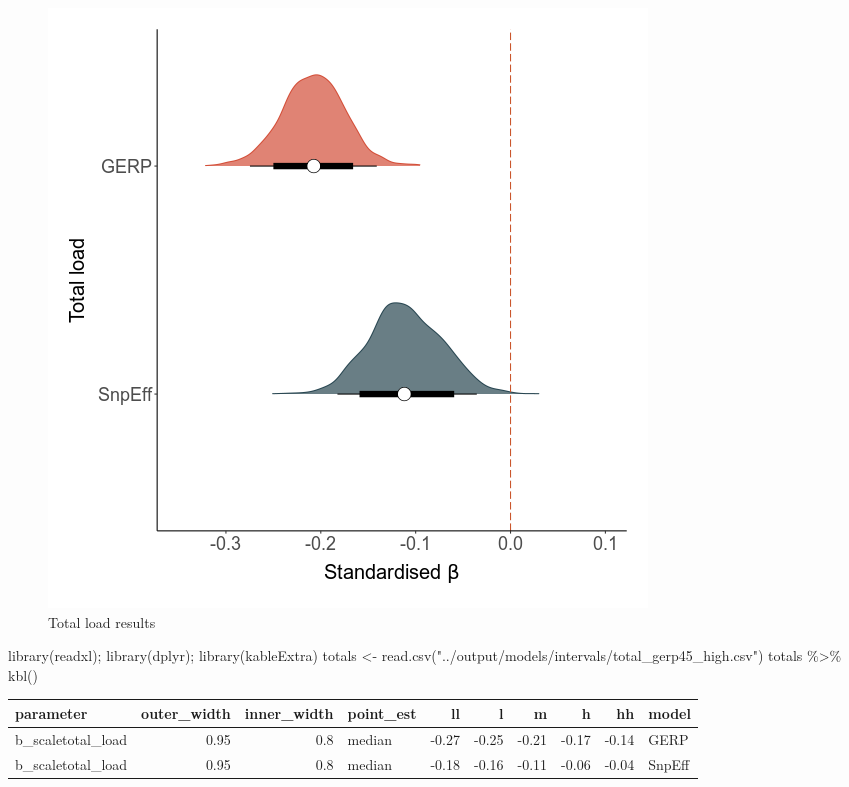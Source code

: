 \documentclass[
  letterpaper,
  DIV=11,
  numbers=noendperiod]{scrreprt}
\newenvironment{Shaded}{}{}
\newcommand{\FunctionTok}[1]{\textcolor[rgb]{0.44,0.26,0.76}{#1}}
\newcommand{\NormalTok}[1]{\textcolor[rgb]{0.14,0.16,0.18}{#1}}
\newcommand{\OtherTok}[1]{\textcolor[rgb]{0.44,0.26,0.76}{#1}}
\newcommand{\SpecialCharTok}[1]{\textcolor[rgb]{0.00,0.36,0.77}{#1}}
\newcommand{\StringTok}[1]{\textcolor[rgb]{0.01,0.18,0.38}{#1}}
\begin{document}
\begin{figure}

{\centering \includegraphics{qmd/../plots/main/fig_2a.png}

}

\caption{Total load results}

\end{figure}

\begin{Shaded}
\begin{Highlighting}[]
\FunctionTok{library}\NormalTok{(readxl); }\FunctionTok{library}\NormalTok{(dplyr); }\FunctionTok{library}\NormalTok{(kableExtra)}
\NormalTok{totals }\OtherTok{\textless{}{-}} \FunctionTok{read.csv}\NormalTok{(}\StringTok{"../output/models/intervals/total\_gerp45\_high.csv"}\NormalTok{)}
\NormalTok{totals }\SpecialCharTok{\%\textgreater{}\%} \FunctionTok{kbl}\NormalTok{() }
\end{Highlighting}
\end{Shaded}

\begin{tabular}[t]{l|r|r|l|r|r|r|r|r|l}
\hline
parameter & outer\_width & inner\_width & point\_est & ll & l & m & h & hh & model\\
\hline
b\_scaletotal\_load & 0.95 & 0.8 & median & -0.27 & -0.25 & -0.21 & -0.17 & -0.14 & GERP\\
\hline
b\_scaletotal\_load & 0.95 & 0.8 & median & -0.18 & -0.16 & -0.11 & -0.06 & -0.04 & SnpEff\\
\hline
\end{tabular}
\end{document}

